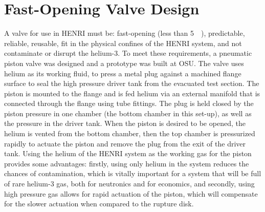 \section{Fast-Opening Valve Design} \label{s:design}
A valve for use in HENRI must be: fast-opening (less than \SI{5}{\milli\seconds}), predictable, reliable, reusable, fit in the physical confines of the HENRI system, and not contaminate or disrupt the helium-3. 
To meet these requirements, a pneumatic piston valve was designed and a prototype was built at OSU. The valve uses helium as its working fluid, to press a metal plug against a machined flange surface to seal the high pressure driver tank from the evacuated test section. The piston is mounted to the flange and is fed helium via an external manifold that is connected through the flange using tube fittings. The plug is held closed by the piston pressure in one chamber (the bottom chamber in this set-up), as well as the pressure in the driver tank. When the piston is desired to be opened, the helium is vented from the bottom chamber, then the top chamber is pressurized rapidly to actuate the piston and remove the plug from the exit of the driver tank. Using the helium of the HENRI system as the working gas for the piston provides some advantages: firstly, using only helium in the system reduces the chances of contamination, which is vitally important for a system that will be full of rare helium-3 gas, both for neutronics and for economics, and secondly, using high pressure gas allows for rapid actuation of the piston, which will compensate for the slower actuation when compared to the rupture disk.



